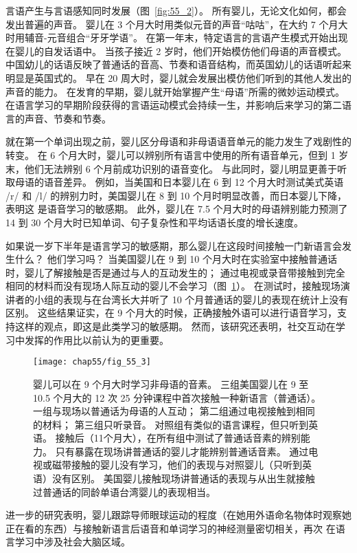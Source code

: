 言语产生与言语感知同时发展（图~\ref{fig:55_2}）。
所有婴儿，无论文化如何，都会发出普遍的声音。
婴儿在 3 个月大时用类似元音的声音“咕咕”，在大约 7 个月大时用辅音-元音组合“牙牙学语”。
在第一年末，特定语言的言语产生模式开始出现在婴儿的自发话语中。
当孩子接近 2 岁时，他们开始模仿他们母语的声音模式。
中国幼儿的话语反映了普通话的音高、节奏和语音结构，而英国幼儿的话语听起来明显是英国式的。
早在 20 周大时，婴儿就会发展出模仿他们听到的其他人发出的声音的能力。
在发育的早期，婴儿就开始掌握产生“母语”所需的微妙运动模式。
在语言学习的早期阶段获得的言语运动模式会持续一生，并影响后来学习的第二语言的声音、节奏和节奏。


就在第一个单词出现之前，婴儿区分母语和非母语语音单元的能力发生了戏剧性的转变。
在 6 个月大时，婴儿可以辨别所有语言中使用的所有语音单元，但到 1 岁末，他们无法辨别 6 个月前成功识别的语音变化。
与此同时，婴儿明显更善于听取母语的语音差异。
例如，当美国和日本婴儿在 6 到 12 个月大时测试美式英语 /r/ 和 /l/ 的辨别力时，美国婴儿在 8 到 10 个月时明显改善，而日本婴儿下降，表明这 是语音学习的敏感期。
此外，婴儿在 7.5 个月大时的母语辨别能力预测了 14 到 30 个月大时已知单词、句子复杂性和平均话语长度的增长速度。


如果说一岁下半年是语言学习的敏感期，那么婴儿在这段时间接触一门新语言会发生什么？
他们学习吗？
当美国婴儿在 9 到 10 个月大时在实验室中接触普通话时，婴儿了解接触是否是通过与人的互动发生的；
通过电视或录音带接触到完全相同的材料而没有现场人际互动的婴儿不会学习（图~\ref{fig:55_3}）。
在测试时，接触现场演讲者的小组的表现与在台湾长大并听了 10 个月普通话的婴儿的表现在统计上没有区别。 这些结果证实，在 9 个月大的时候，正确接触外语可以进行语音学习，支持这样的观点，即这是此类学习的敏感期。
然而，该研究还表明，社交互动在学习中发挥的作用比以前认为的更重要。


\begin{figure}[htbp]
	\centering
	\texttt{[image: chap55/fig\_55\_3]}
	\caption{婴儿可以在 9 个月大时学习非母语的音素。
		三组美国婴儿在 9 至 10.5 个月大的 12 次 25 分钟课程中首次接触一种新语言（普通话）。
		一组与现场以普通话为母语的人互动；
		第二组通过电视接触到相同的材料；
		第三组只听录音。
		对照组有类似的语言课程，但只听到英语。
		接触后（11个月大），在所有组中测试了普通话音素的辨别能力\cite{kuhl2003foreign}。
		只有暴露在现场讲普通话的婴儿才能辨别普通话音素。
		通过电视或磁带接触的婴儿没有学习，他们的表现与对照婴儿（只听到英语）没有区别。
		美国婴儿接触现场讲普通话的表现与从出生就接触过普通话的同龄单语台湾婴儿的表现相当。}
	\label{fig:55_3}
\end{figure}


进一步的研究表明，婴儿跟踪导师眼球运动的程度（在她用外语命名物体时观察她正在看的东西）与接触新语言后语音和单词学习的神经测量密切相关，再次 在语言学习中涉及社会大脑区域。



